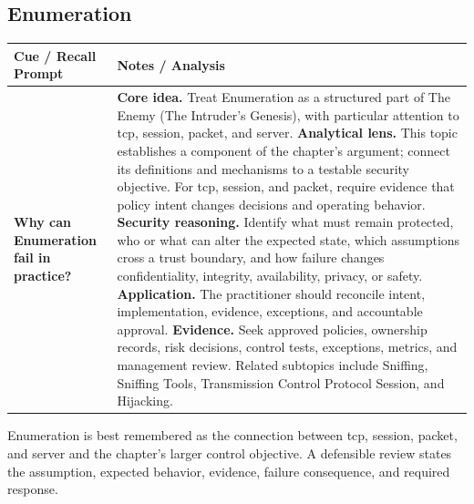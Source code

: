\documentclass[11pt]{article}
\newcommand{\CornellHeader}{%
\rowcolor{Navy}\color{white}\bfseries Cue / Recall Prompt & \color{white}\bfseries Notes / Analysis\\\hline}
\newcommand{\CornellRow}[2]{%
\cellcolor{CueGray}\RaggedRight\textbf{#1} & \RaggedRight #2\\\hline}
\begin{document}
\subsection*{Enumeration}
\begin{longtable}{>{\RaggedRight\arraybackslash}p{}|>{\RaggedRight\arraybackslash}p{}}
\CornellHeader
\CornellRow{Why can Enumeration fail in practice?}{\textbf{Core idea.} Treat Enumeration as a structured part of The Enemy (The Intruder's Genesis), with particular attention to tcp, session, packet, and server. \textbf{Analytical lens.} This topic establishes a component of the chapter's argument; connect its definitions and mechanisms to a testable security objective. For tcp, session, and packet, require evidence that policy intent changes decisions and operating behavior. \textbf{Security reasoning.} Identify what must remain protected, who or what can alter the expected state, which assumptions cross a trust boundary, and how failure changes confidentiality, integrity, availability, privacy, or safety. \textbf{Application.} The practitioner should reconcile intent, implementation, evidence, exceptions, and accountable approval. \textbf{Evidence.} Seek approved policies, ownership records, risk decisions, control tests, exceptions, metrics, and management review. Related subtopics include Sniffing, Sniffing Tools, Transmission Control Protocol Session, and Hijacking.}
\end{longtable}
\begin{topicsummary}
Enumeration is best remembered as the connection between tcp, session, packet, and server and the chapter's larger control objective. A defensible review states the assumption, expected behavior, evidence, failure consequence, and required response.
\end{topicsummary}
\end{document}
